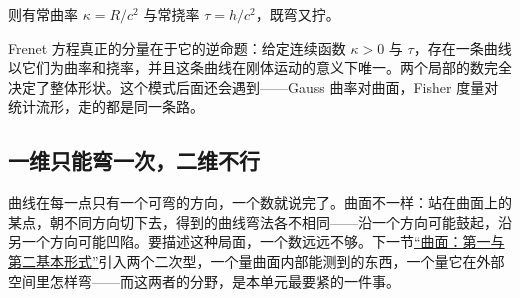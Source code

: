 则有常曲率 \(\kappa=R/c^{2}\) 与常挠率 \(\tau=h/c^{2}\)，既弯又拧。

Frenet 方程真正的分量在于它的逆命题：给定连续函数 \(\kappa>0\) 与 \(\tau\)，存在一条曲线以它们为曲率和挠率，并且这条曲线在刚体运动的意义下唯一。两个局部的数完全决定了整体形状。这个模式后面还会遇到——Gauss 曲率对曲面，Fisher 度量对统计流形，走的都是同一条路。

\subsection{一维只能弯一次，二维不行}

曲线在每一点只有一个可弯的方向，一个数就说完了。曲面不一样：站在曲面上的某点，朝不同方向切下去，得到的曲线弯法各不相同——沿一个方向可能鼓起，沿另一个方向可能凹陷。要描述这种局面，一个数远远不够。下一节\hyperref[sec:12-Real-Analysis-Support/11-Curve-and-Surface-Geometry/02]{``曲面：第一与第二基本形式''}引入两个二次型，一个量曲面内部能测到的东西，一个量它在外部空间里怎样弯——而这两者的分野，是本单元最要紧的一件事。
